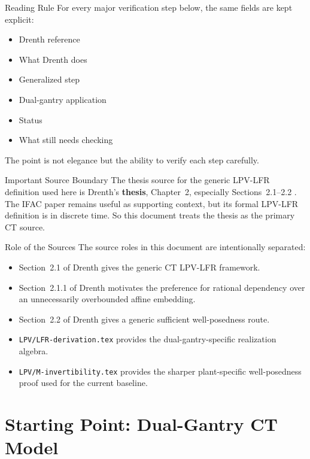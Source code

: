 \documentclass[11pt]{article}
\begin{document}
\begin{notebox}{Reading Rule}
For every major verification step below, the same fields are kept explicit:
\begin{itemize}[leftmargin=1.2em]
    \item Drenth reference
    \item What Drenth does
    \item Generalized step
    \item Dual-gantry application
    \item Status
    \item What still needs checking
\end{itemize}
The point is not elegance but the ability to verify each step carefully.
\end{notebox}

\begin{warningbox}{Important Source Boundary}
The thesis source for the generic LPV-LFR definition used here is Drenth's
\textbf{thesis}, Chapter~2, especially Sections~2.1--2.2
\cite{drenth2025thesis}. The IFAC paper \cite{drenth2025lpvlfr} remains useful
as supporting context, but its formal LPV-LFR definition is in discrete time.
So this document treats the thesis as the primary CT source.
\end{warningbox}

\begin{notebox}{Role of the Sources}
The source roles in this document are intentionally separated:
\begin{itemize}[leftmargin=1.2em]
    \item Section~2.1 of Drenth gives the generic CT LPV-LFR framework.
    \item Section~2.1.1 of Drenth motivates the preference for rational
    dependency over an unnecessarily overbounded affine embedding.
    \item Section~2.2 of Drenth gives a generic sufficient well-posedness route.
    \item \texttt{LPV/LFR-derivation.tex} provides the dual-gantry-specific
    realization algebra.
    \item \texttt{LPV/M-invertibility.tex} provides the sharper
    plant-specific well-posedness proof used for the current baseline.
\end{itemize}
\end{notebox}

\section{Starting Point: Dual-Gantry CT Model}
\end{document}
